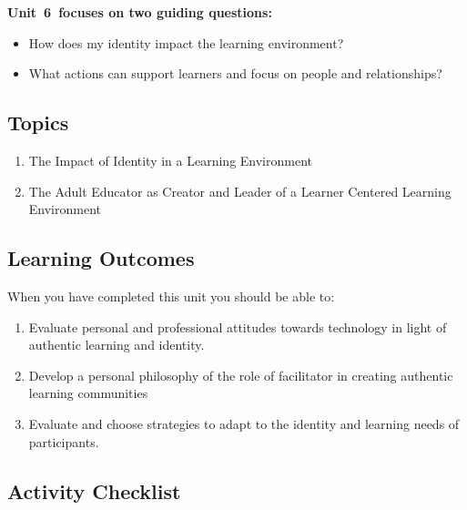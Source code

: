 \documentclass[
]{book}
\providecommand{\tightlist}{%
  \setlength{\itemsep}{0pt}\setlength{\parskip}{0pt}}
\begin{document}
\textbf{Unit~6~focuses on two guiding questions:}

\begin{itemize}
\tightlist
\item
  How does my identity impact the learning environment?\\
\item
  What actions can support learners and focus on people and relationships?
\end{itemize}

\hypertarget{topics-5}{%
\subsection*{Topics}\label{topics-5}}

\begin{enumerate}
\def\labelenumi{\arabic{enumi}.}
\tightlist
\item
  The Impact of Identity in a Learning Environment\\
\item
  The Adult Educator as Creator and Leader of a Learner Centered Learning Environment
\end{enumerate}

\hypertarget{learning-outcomes-5}{%
\subsection*{Learning Outcomes}\label{learning-outcomes-5}}

When you have completed this unit you should be able to:

\begin{enumerate}
\def\labelenumi{\arabic{enumi}.}
\tightlist
\item
  Evaluate personal and professional attitudes towards technology in light of authentic learning and identity.\\
\item
  Develop a personal philosophy of the role of facilitator in creating authentic learning communities\\
\item
  Evaluate and choose strategies to adapt to the identity and learning needs of participants.
\end{enumerate}

\hypertarget{activity-checklist-5}{%
\subsection*{Activity Checklist}\label{activity-checklist-5}}
\end{document}
